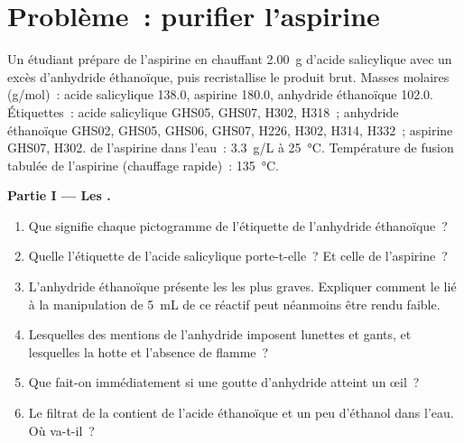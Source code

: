 \section{Problème~: purifier l'aspirine}

\begin{problem}
\label{pb:b1:lab-techniques-1:1}
Un étudiant prépare de l'aspirine en chauffant \qty{2.00}{g} d'acide
salicylique avec un excès d'anhydride éthanoïque, puis recristallise le
produit brut. Masses molaires (\unit{g/mol})~: acide salicylique
 138.0, aspirine
 180.0, anhydride éthanoïque  102.0.
Étiquettes~: acide salicylique GHS05, GHS07, H302, H318~; anhydride
éthanoïque GHS02, GHS05, GHS06, GHS07, H226, H302, H314, H332~;
aspirine GHS07, H302.  de l'aspirine dans l'eau~:
\qty{3.3}{g/L} à \qty{25}{\celsius}. Température de fusion tabulée de
l'aspirine (chauffage rapide)~: \qty{135}{\celsius}.

\medskip
\noindent\textbf{Partie I --- Les .}
\begin{enumerate}
  \item Que signifie chaque pictogramme de l'étiquette de l'anhydride
        éthanoïque~?
  \item Quelle  l'étiquette de l'acide
        salicylique porte-t-elle~? Et celle de l'aspirine~?
  \item L'anhydride éthanoïque présente les  les plus graves.
        Expliquer comment le  lié à la manipulation de
        \qty{5}{mL} de ce réactif peut néanmoins être rendu faible.
  \item Lesquelles des mentions de l'anhydride imposent lunettes et
        gants, et lesquelles la hotte et l'absence de flamme~?
  \item Que fait-on immédiatement si une goutte d'anhydride atteint un
        œil~?
  \item Le filtrat de la  contient de l'acide
        éthanoïque et un peu d'éthanol dans l'eau. Où va-t-il~?
\end{enumerate}


\end{problem}
